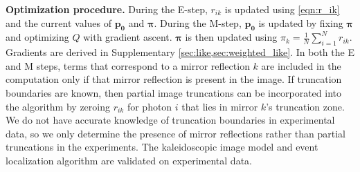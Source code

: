 \noindent
\textbf{Optimization procedure.}
During the E-step, $r_{ik}$ is updated using \cref{eqn:r_ik} and the current 
values of $\bm{p_0}$ and $\bm{\pi}$.
During the M-step, $\bm{p_0}$ is updated by fixing $\bm{\pi}$ and optimizing 
$Q$ with gradient ascent. 
$\bm{\pi}$ is then updated using $\pi_k=\frac{1}{N}\sum_{i=1}^N r_{ik}$.
Gradients are derived in Supplementary \cref*{sec:like,sec:weighted_like}.
In both the E and M steps, terms that correspond to a mirror reflection $k$ are 
included in the computation only if that mirror reflection is present in the image.
If truncation boundaries are known, then partial image truncations 
can be incorporated into the algorithm by zeroing $r_{ik}$ for photon
$i$ that lies in mirror $k$'s truncation zone.
We do not have accurate knowledge of truncation boundaries in experimental data,
so we only determine the presence of mirror reflections rather than partial 
truncations in the experiments.
The kaleidoscopic image model and event localization algorithm are validated on 
experimental data.